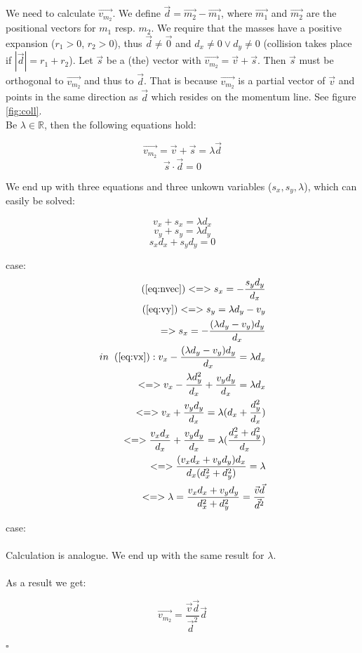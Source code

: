 \documentclass[a4paper]{article}
\newcommand{\spc}{\hspace{0.2cm}}
\begin{document}
We need to calculate $\vec{v_{m_2}}$. We define $\vec{d}=\vec{m_2}-\vec{m_1}$, where $\vec{m_1}$ and $\vec{m_2}$ are the positional vectors for $m_1$ resp. $m_2$.
We require that the masses have a positive expansion ($r_1>0$, $r_2>0$), thus $\vec{d} \neq \vec{0}$ and $d_x \neq 0 \vee d_y \neq 0$ (collision takes place if
$|\vec{d}|=r_1+r_2$). Let $\vec{s}$ be a (the) vector with
$\vec{v_{m_2}}=\vec{v}+\vec{s}$. Then $\vec{s}$ must be orthogonal to $\vec{v_{m_2}}$ and thus to $\vec{d}$. That is because $\vec{v_{m_2}}$ is a partial vector of $\vec{v}$
and points in the same direction as $\vec{d}$ which resides on the momentum line. See figure \ref{fig:coll}.\\
Be $\lambda \in \mathbb{R}$, then the following equations hold:

\begin{displaymath}
  \vec{v_{m_2}}=\vec{v}+\vec{s}=\lambda \vec{d}
\end{displaymath}
\begin{displaymath}
  \vec{s}\cdot\vec{d}=0
\end{displaymath}

We end up with three equations and three unkown variables ($s_x,s_y,\lambda$), which can easily be solved:

\begin{equation}
  v_x+s_x=\lambda d_x
  \label{eq:vx}
\end{equation}
\begin{equation}
  v_y+s_y=\lambda d_y
  \label{eq:vy}
\end{equation}
\begin{equation}
  s_xd_x+s_yd_y=0
  \label{eq:nvec}
\end{equation}

case: 
\begin{align}
  (\ref{eq:nvec}) <=> s_x=-\frac{s_y d_y}{d_x}\\
  (\ref{eq:vy}) <=> s_y=\lambda d_y-v_y\\
  => s_x=-\frac{(\lambda d_y-v_y)d_y}{d_x}\\
  in \spc (\ref{eq:vx}) : v_x-\frac{(\lambda d_y-v_y)d_y}{d_x}=\lambda d_x\\
  <=> v_x-\frac{\lambda d_y^2}{d_x}+\frac{v_yd_y}{d_x}=\lambda d_x\\
  <=> v_x+\frac{v_yd_y}{d_x}=\lambda (d_x+\frac{d_y^2}{d_x})\\
  <=>\frac{v_xd_x}{d_x}+\frac{v_yd_y}{d_x}=\lambda (\frac{d_x^2+d_y^2}{d_x})\\
  <=>\frac{(v_xd_x+v_yd_y)d_x}{d_x(d_x^2+d_y^2)}=\lambda\\
  <=>\lambda=\frac{v_xd_x+v_yd_y}{d_x^2+d_y^2}=\frac{\vec{v}\vec{d}}{\vec{d}^2}
\end{align}

case: \\\\
Calculation is analogue. We end up with the same result for $\lambda$.\\\\

As a result we get:

\begin{displaymath}
  \vec{v_{m_2}}=\frac{\vec{v}\vec{d}}{\vec{d}^2}\vec{d}
\end{displaymath}
\\
$\square$
\end{document}
